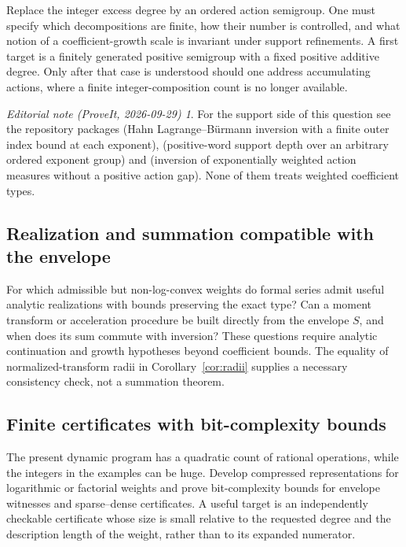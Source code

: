 \documentclass[11pt,a4paper]{article}
\numberwithin{equation}{section}
\theoremstyle{definition}
\theoremstyle{remark}
\newtheorem*{ednote}{Editorial note (ProveIt, 2026-09-29)}
\begin{document}
Replace the integer excess degree by an ordered action semigroup. One
must specify which decompositions are finite, how their number is
controlled, and what notion of a coefficient-growth scale is invariant
under support refinements. A first target is a finitely generated positive
semigroup with a fixed positive additive degree. Only after that case is
understood should one address accumulating actions, where a finite
integer-composition count is no longer available.
\begin{ednote}
For the support side of this question see the repository packages
 (Hahn
Lagrange--B\"urmann inversion with a finite outer index bound at each
exponent),  (positive-word
support depth over an arbitrary ordered exponent group) and
 (inversion of
exponentially weighted action measures without a positive action gap).
None of them treats weighted coefficient types.
\end{ednote}

\subsection{Realization and summation compatible with the envelope}

For which admissible but non-log-convex weights do formal series admit
useful analytic realizations with bounds preserving the exact type?
Can a moment transform or acceleration procedure be built directly from
the envelope $S$, and when does its sum commute with inversion? These
questions require analytic continuation and growth hypotheses beyond
coefficient bounds. The equality of normalized-transform radii in
Corollary~\ref{cor:radii} supplies a necessary consistency check, not a
summation theorem.

\subsection{Finite certificates with bit-complexity bounds}

The present dynamic program has a quadratic count of rational operations,
while the integers in the examples can be huge. Develop compressed
representations for logarithmic or factorial weights and prove
bit-complexity bounds for envelope witnesses and sparse--dense
certificates. A useful target is an independently checkable certificate
whose size is small relative to the requested degree and the description
length of the weight, rather than to its expanded numerator.
\end{document}
